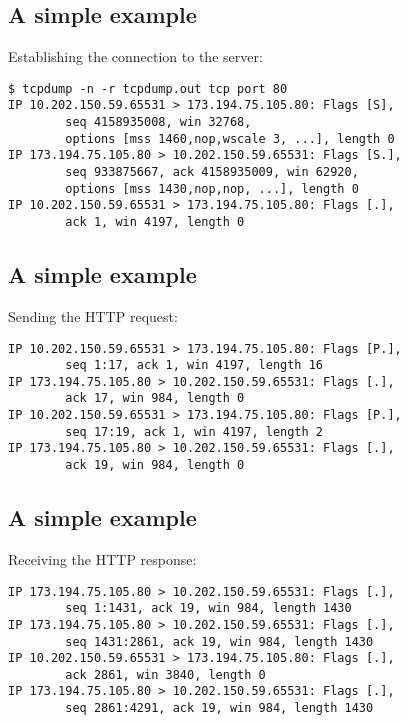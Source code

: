 \documentclass[xga]{xdvislides}
\begin{document}
\subsection{A simple example}
Establishing the connection to the server:
\begin{verbatim}
$ tcpdump -n -r tcpdump.out tcp port 80
IP 10.202.150.59.65531 > 173.194.75.105.80: Flags [S],
        seq 4158935008, win 32768,
        options [mss 1460,nop,wscale 3, ...], length 0
IP 173.194.75.105.80 > 10.202.150.59.65531: Flags [S.],
        seq 933875667, ack 4158935009, win 62920,
        options [mss 1430,nop,nop, ...], length 0
IP 10.202.150.59.65531 > 173.194.75.105.80: Flags [.],
        ack 1, win 4197, length 0
\end{verbatim}

\subsection{A simple example}
Sending the HTTP request:
\begin{verbatim}
IP 10.202.150.59.65531 > 173.194.75.105.80: Flags [P.],
        seq 1:17, ack 1, win 4197, length 16
IP 173.194.75.105.80 > 10.202.150.59.65531: Flags [.],
        ack 17, win 984, length 0
IP 10.202.150.59.65531 > 173.194.75.105.80: Flags [P.],
        seq 17:19, ack 1, win 4197, length 2
IP 173.194.75.105.80 > 10.202.150.59.65531: Flags [.],
        ack 19, win 984, length 0
\end{verbatim}

\subsection{A simple example}
Receiving the HTTP response:
\begin{verbatim}
IP 173.194.75.105.80 > 10.202.150.59.65531: Flags [.],
        seq 1:1431, ack 19, win 984, length 1430
IP 173.194.75.105.80 > 10.202.150.59.65531: Flags [.],
        seq 1431:2861, ack 19, win 984, length 1430
IP 10.202.150.59.65531 > 173.194.75.105.80: Flags [.],
        ack 2861, win 3840, length 0
IP 173.194.75.105.80 > 10.202.150.59.65531: Flags [.],
        seq 2861:4291, ack 19, win 984, length 1430
\end{verbatim}
\end{document}
